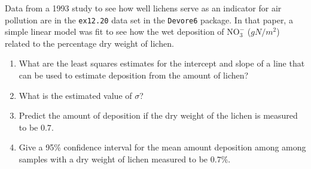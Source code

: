 \documentclass[twoside]{book}\usepackage[]{graphicx}\usepackage[]{xcolor}
\newcommand{\Rindex}[1]{\index{\texttt{#1}}}
\newcommand{\dataframe}[1]{{\color{blue!80!black}\texttt{#1}}\Rindex{#1}}
\newcommand{\pkg}[1]{{\color{red!80!black}\texttt{#1}}\Rindex{#1}}
\begin{document}
\begin{problem}
Data from a 1993 study to see how well lichens serve as an indicator for air pollution
are in the \dataframe{ex12.20} data set in the \pkg{Devore6} package.  In that paper,
a simple linear model was fit to see how the wet deposition of $\mathrm{NO}_{3}^{-}$
($g N/m^2$) related to the percentage dry weight of lichen.
\begin{enumerate}
	\item What are the least squares estimates for the intercept and slope of a line
		that can be used to estimate deposition
		from the amount of lichen?
	\item
		What is the estimated value of $\sigma$?
	\item
		Predict the amount of deposition if the dry weight of the 
		lichen is measured to be $0.7$.
	\item
		Give a 95\% confidence interval for the mean amount deposition among
		among samples with a dry weight of lichen measured to be $0.7\%$.
\end{enumerate}
\end{problem}
\end{document}
